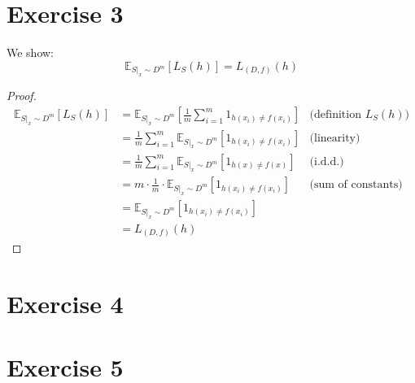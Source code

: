 \documentclass[12pt]{scrartcl}
\begin{document}
\section*{Exercise 3}
We show: 
\begin{equation*}
\mathbb{E}_{S|_x \sim D^m}[L_S(h)]  = L_{(D,f)}(h)
\end{equation*}

\begin{proof}
	\begin{equation*}
		\begin{aligned}
			\mathbb{E}_{S|_x \sim D^m}[L_S(h)]  & = \mathbb{E}_{S|_x \sim D^m}\left[\frac{1}{m}\sum_{i=1}^{m} 1_{h(x_i)\neq f(x_i)}\right] & \text{(definition } L_S(h)\text{)} \\
												& = \frac{1}{m}\sum_{i=1}^{m} \mathbb{E}_{S|_x \sim D^m}\left[ 1_{h(x_i)\neq f(x_i)}\right] & \text{(linearity)} \\
												& = \frac{1}{m}\sum_{i=1}^{m} \mathbb{E}_{S|_x \sim D^m}\left[ 1_{h(x)\neq f(x)}\right] & \text{(i.d.d.)} \\
												& = m \cdot \frac{1}{m} \cdot \mathbb{E}_{S|_x \sim D^m}\left[1_{h(x_i)\neq f(x_i)}\right]  & \text{(sum of constants)} \\
												& = \mathbb{E}_{S|_x \sim D^m}\left[1_{h(x_i)\neq f(x_i)}\right] & \\
												& = L_{(D,f)}(h)
		\end{aligned}
	\end{equation*}
\end{proof}

\section*{Exercise 4}

\section*{Exercise 5}

	
\end{document}
